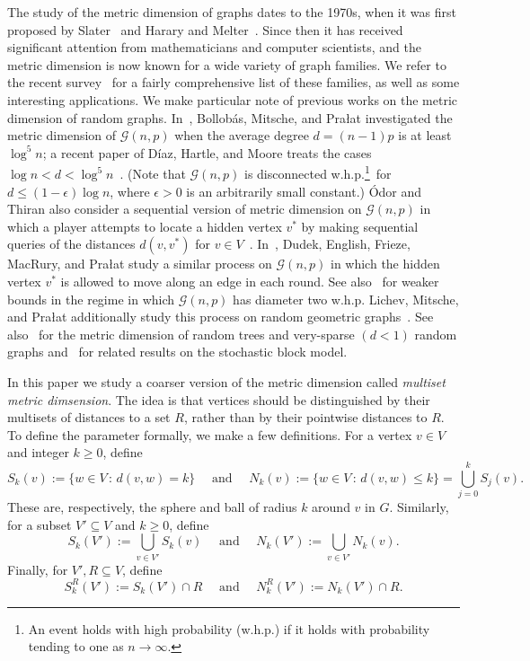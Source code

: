 \documentclass[12pt]{article}
\theoremstyle{definition}
\theoremstyle{remark}
\theoremstyle{remark}
\numberwithin{theorem}{section}
\newcommand{\Gnp}{\mathcal{G}(n,p)}
\begin{document}
The study of the metric dimension of graphs dates to the 1970s, when it was first proposed by Slater~\cite{slater1975leaves} and Harary and Melter~\cite{harary1976metric}. Since then it has received significant attention from mathematicians and computer scientists, and the metric dimension is now known for a wide variety of graph families. We refer to the recent survey~\cite{tillquist2023getting} for a fairly comprehensive list of these families, as well as some interesting applications. We make particular note of previous works on the metric dimension of random graphs. In~\cite{bollobas2013metric}, Bollob\'{a}s, Mitsche, and Pra\l{}at investigated the metric dimension of $\Gnp$ when the average degree $d = (n-1)p$ is at least $\log^{5}n$; a recent paper of D\'{i}az, Hartle, and Moore treats the cases $\log n < d < \log^{5}n$~\cite{diaz2025metric}. (Note that $\Gnp$ is disconnected w.h.p.\footnote{An event holds with high probability (w.h.p.) if it holds with probability tending to one as $n \to \infty$.}\ for $d \leq (1-\epsilon)\log n$, where $\epsilon > 0$ is an arbitrarily small constant.) \'{O}dor and Thiran also consider a sequential version of metric dimension on $\Gnp$ in which a player attempts to locate a hidden vertex $v^{*}$ by making sequential queries of the distances $d(v,v^{*})$ for $v \in V$~\cite{odor2021sequential,odor2022role}. In~\cite{dudek2022localization}, Dudek, English, Frieze, MacRury, and Pra\l{}at study a similar process on $\Gnp$ in which the hidden vertex $v^{*}$ is allowed  to move along an edge in each round. See also~\cite{dudek2019note} for weaker bounds in the regime in which $\Gnp$ has diameter two w.h.p. Lichev, Mitsche, and Pra\l{}at additionally study this process on random geometric graphs~\cite{lichev2023localization}. See also~\cite{mitsche2015limiting} for the metric dimension of random trees and very-sparse $(d<1)$ random graphs and~\cite{tillquist2019multilateration} for related results on the stochastic block model.

In this paper we study a coarser version of the metric dimension called \textit{multiset metric dimsension}. The idea is that vertices should be distinguished by their multisets of distances to a set $R$, rather than by their pointwise distances to $R$. To define the parameter formally, we make a few definitions. For a vertex $v \in V$ and integer $k \geq 0$, define
$$
	S_{k}(v) := \{w \in V \,:\,d(v,w) = k\} \quad \text{ and } \quad N_{k}(v) := \{w \in V\,:\,d(v,w) \leq k\} = \bigcup_{j=0}^{k}S_{j}(v).
$$
These are, respectively, the sphere and ball of radius $k$ around $v$ in $G$. Similarly, for a subset $V' \subseteq V$ and $k \geq 0$, define
$$
	S_{k}(V') := \bigcup_{v \in V'}S_{k}(v) \quad \text{ and }\quad N_{k}(V') := \bigcup_{v \in V'}N_{k}(v).
$$
Finally, for $V', R \subseteq V$, define 
$$
	S_{k}^{R}(V') := S_{k}(V') \cap R \quad\text{ and }\quad N_{k}^{R}(V') := N_{k}(V') \cap R.
$$ 
\end{document}
